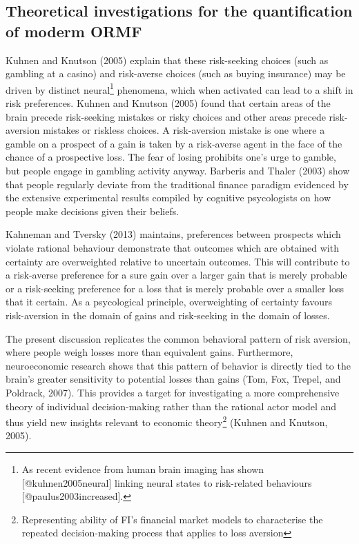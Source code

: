 \documentclass[]{DissertateUSU}
\let\rmarkdownfootnote\footnote%
\def\footnote{\protect\rmarkdownfootnote}
\begin{document}
\subsection{Theoretical investigations for the quantification of moderm ORMF}

Kuhnen and Knutson (2005) explain that these risk-seeking choices (such
as gambling at a casino) and risk-averse choices (such as buying
insurance) may be driven by distinct
neural\footnote{As recent evidence from human brain imaging has shown [@kuhnen2005neural] linking neural states to risk-related behaviours [@paulus2003increased].}
phenomena, which when activated can lead to a shift in risk preferences.
Kuhnen and Knutson (2005) found that certain areas of the brain precede
risk-seeking mistakes or risky choices and other areas precede
risk-aversion mistakes or riskless choices. A risk-aversion mistake is
one where a gamble on a prospect of a gain is taken by a risk-averse
agent in the face of the chance of a prospective loss. The fear of
losing prohibits one's urge to gamble, but people engage in gambling
activity anyway. Barberis and Thaler (2003) show that people regularly
deviate from the traditional finance paradigm evidenced by the extensive
experimental results compiled by cognitive psycologists on how people
make decisions given their beliefs.\medskip 

Kahneman and Tversky (2013) maintains, preferences between prospects
which violate rational behaviour demonstrate that outcomes which are
obtained with certainty are overweighted relative to uncertain outcomes.
This will contribute to a risk-averse preference for a sure gain over a
larger gain that is merely probable or a risk-seeking preference for a
loss that is merely probable over a smaller loss that it certain. As a
psycological principle, overweighting of certainty favours risk-aversion
in the domain of gains and risk-seeking in the domain of losses.\medskip

The present discussion replicates the common behavioral pattern of risk
aversion, where people weigh losses more than equivalent gains.
Furthermore, neuroeconomic research shows that this pattern of behavior
is directly tied to the brain's greater sensitivity to potential losses
than gains (Tom, Fox, Trepel, and Poldrack, 2007). This provides a
target for investigating a more comprehensive theory of individual
decision-making rather than the rational actor model and thus yield new
insights relevant to economic
theory\footnote{Representing ability of FI's financial market models to characterise the repeated decision-making process that applies to loss aversion}
(Kuhnen and Knutson, 2005).\medskip  
\end{document}
